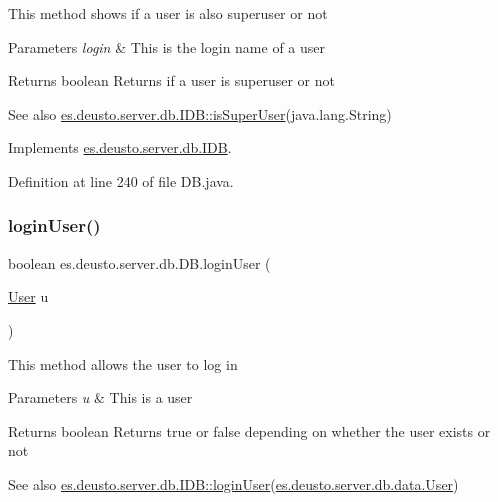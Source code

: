 This method shows if a user is also superuser or not 
\begin{DoxyParams}{Parameters}
{\em login} & This is the login name of a user \\
\hline
\end{DoxyParams}
\begin{DoxyReturn}{Returns}
boolean Returns if a user is superuser or not 
\end{DoxyReturn}
\begin{DoxySeeAlso}{See also}
\hyperlink{interfacees_1_1deusto_1_1server_1_1db_1_1_i_d_b_a279d8a59498d4157f2d20ce7f0c4cfdb}{es.\+deusto.\+server.\+db.\+I\+D\+B\+::is\+Super\+User}(java.\+lang.\+String) 
\end{DoxySeeAlso}


Implements \hyperlink{interfacees_1_1deusto_1_1server_1_1db_1_1_i_d_b_a279d8a59498d4157f2d20ce7f0c4cfdb}{es.\+deusto.\+server.\+db.\+I\+DB}.



Definition at line 240 of file D\+B.\+java.

\mbox{\label{classes_1_1deusto_1_1server_1_1db_1_1_d_b_a8e5744311b5924e740d190673abee104}} 
\subsubsection{\texorpdfstring{login\+User()}{loginUser()}}
{\footnotesize\ttfamily boolean es.\+deusto.\+server.\+db.\+D\+B.\+login\+User (\begin{DoxyParamCaption}\item[{\hyperlink{classes_1_1deusto_1_1server_1_1db_1_1data_1_1_user}{User}}]{u }\end{DoxyParamCaption})}

This method allows the user to log in 
\begin{DoxyParams}{Parameters}
{\em u} & This is a user \\
\hline
\end{DoxyParams}
\begin{DoxyReturn}{Returns}
boolean Returns true or false depending on whether the user exists or not 
\end{DoxyReturn}
\begin{DoxySeeAlso}{See also}
\hyperlink{interfacees_1_1deusto_1_1server_1_1db_1_1_i_d_b_a6e6196e5899fc93134223373ed8363a6}{es.\+deusto.\+server.\+db.\+I\+D\+B\+::login\+User}(\hyperlink{classes_1_1deusto_1_1server_1_1db_1_1data_1_1_user}{es.\+deusto.\+server.\+db.\+data.\+User}) 
\end{DoxySeeAlso}


